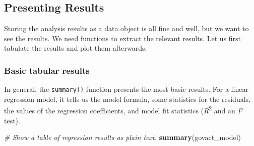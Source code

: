 \documentclass[doc,floatsintext]{apa6}
\newenvironment{Shaded}{\begin{snugshade}}{\end{snugshade}}
\newcommand{\KeywordTok}[1]{\textcolor[rgb]{0.13,0.29,0.53}{\textbf{#1}}}
\newcommand{\CommentTok}[1]{\textcolor[rgb]{0.56,0.35,0.01}{\textit{#1}}}
\newcommand{\NormalTok}[1]{#1}
\begin{document}
\subsection{Presenting Results}\label{presentingresults}

Storing the analysis results as a data object is all fine and well, but
we want to see the results. We need functions to extract the relevant
results. Let us first tabulate the results and plot them afterwards.

\subsubsection{Basic tabular results}\label{basic-tabular-results}

In general, the \texttt{summary()} function presents the most basic
results. For a linear regression model, it tells us the model formula,
some statistics for the residuals, the values of the regression
coefficients, and model fit statistics (\emph{R}\textsuperscript{2} and
an \emph{F} test).

\begin{Shaded}
\begin{Highlighting}[]
\CommentTok{# Show a table of regression results as plain text.}
\KeywordTok{summary}\NormalTok{(govact_model)}
\end{Highlighting}
\end{Shaded}
\end{document}
